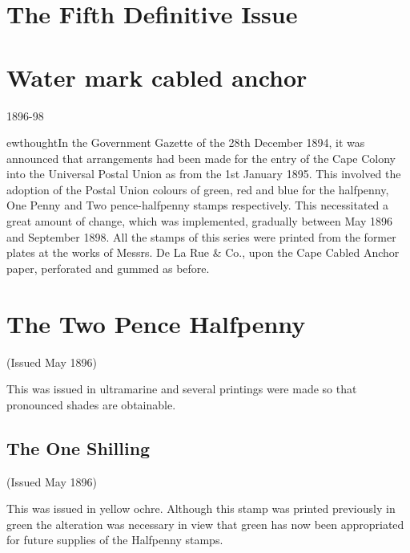 \section{The Fifth Definitive Issue}




\section{Water mark cabled anchor}

1896-98


ewthought{In the Government Gazette} of the 28th December 1894, it was announced 
that arrangements had been made for the entry of the Cape Colony into the Universal Postal Union as from the 1st January 1895. This involved the adoption of the Postal Union colours of green, red and blue for the halfpenny, One Penny and Two pence-halfpenny stamps respectively. This necessitated a great amount of change, which was implemented, gradually between May 1896 and September 1898.
All the stamps of this series were printed from the former plates 
at the works of Messrs. De La Rue \& Co., upon the Cape Cabled Anchor paper, 
perforated and gummed as before.



\section{The Two Pence Halfpenny}

(Issued May 1896)

This was issued in ultramarine and several printings were made so 
that pronounced shades are obtainable.



\subsection{The One Shilling}

(Issued May 1896)

This was issued in yellow ochre. Although this stamp was printed previously in green 
the alteration was necessary in view that green has now been appropriated for future supplies 
of the Halfpenny stamps.


